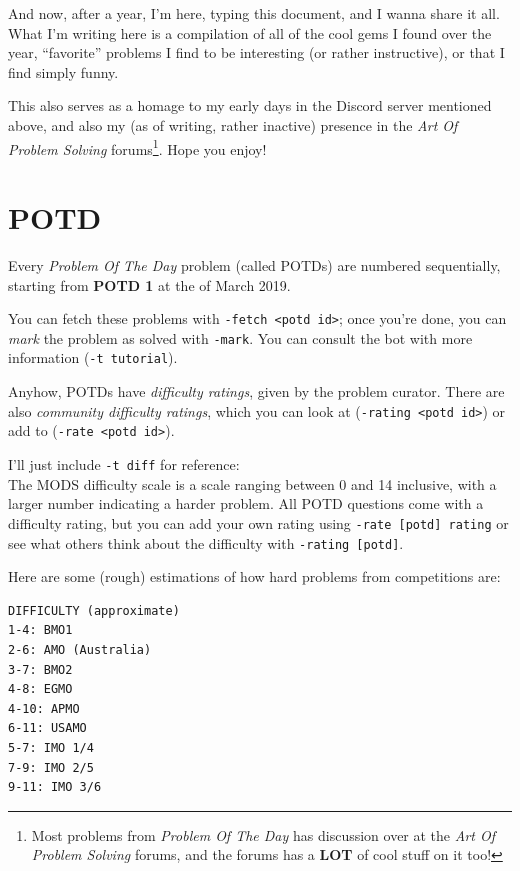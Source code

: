 \documentclass[11pt]{article} %
\theoremstyle{definition}
\theoremstyle{remark}
\begin{document}
And now, after a year, I'm here, typing this document, and I wanna share it all. What I'm writing here is a compilation of all of the \textcolor{purple!80!black}{cool gems} I found over the year, ``favorite'' problems I find to be interesting (or rather instructive), or that I find simply funny.

This also serves as a homage to my early days in the Discord server mentioned above, and also my (as of writing, rather inactive) presence in the \emph{Art Of Problem Solving} forums\footnote{Most problems from \emph{Problem Of The Day} has discussion over at the \emph{Art Of Problem Solving} forums, and the forums has a \textbf{LOT} of cool stuff on it too!}. Hope you enjoy!

\newpage
\tableofcontents

\newpage

\section{POTD}
Every \emph{Problem Of The Day} problem (called POTDs) are numbered sequentially, starting from \textbf{POTD 1} at the  of March 2019.

You can fetch these problems with \texttt{-fetch <potd id>}; once you're done, you can \emph{mark} the problem as solved with \texttt{-mark}. You can consult the bot with more information (\texttt{-t tutorial}).

Anyhow, POTDs have \emph{difficulty ratings}, given by the problem curator. There are also \emph{community difficulty ratings}, which you can look at (\texttt{-rating <potd id>}) or add to (\texttt{-rate <potd id>}).

I'll just include \texttt{-t diff} for reference: \\[1em]

The MODS difficulty scale is a scale ranging between 0 and 14 inclusive,  with a larger number indicating a harder problem.  All POTD questions come with a difficulty rating,  but you can add your own rating using \verb|-rate [potd] rating| or see what others think about the difficulty with \verb|-rating [potd]|.

Here are some (rough) estimations of how hard problems from competitions are:
\begin{verbatim}
DIFFICULTY (approximate)
1-4: BMO1
2-6: AMO (Australia)
3-7: BMO2
4-8: EGMO
4-10: APMO
6-11: USAMO
5-7: IMO 1/4
7-9: IMO 2/5
9-11: IMO 3/6
\end{verbatim}
\end{document}
